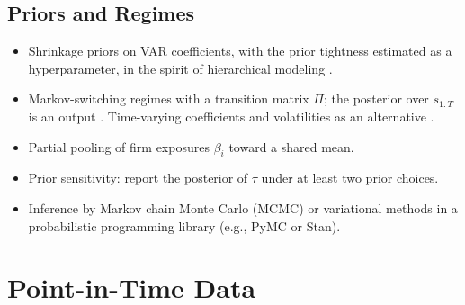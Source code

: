   \subsection{Priors and Regimes}\label{sec:priors_and_regimes}

  \begin{itemize}
  \tightlist
  \item
    Shrinkage priors on VAR coefficients, with the prior tightness
    estimated as a hyperparameter, in the spirit of hierarchical modeling
    \cite{doan1984forecasting,banbura2010large,giannone2015prior}.
  \item
    Markov-switching regimes with a transition matrix \(\Pi\); the
    posterior over \(s_{1:T}\) is an output
    \cite{hamilton1989new,sims2006were}. Time-varying coefficients and
    volatilities as an alternative \cite{primiceri2005time}.
  \item
    Partial pooling of firm exposures \(\beta_i\) toward a shared mean.
  \item
    Prior sensitivity: report the posterior of \(\tau\) under at least two
    prior choices.
  \item
    Inference by Markov chain Monte Carlo (MCMC) or variational methods in
    a probabilistic programming library (e.g., PyMC or Stan).
  \end{itemize}


  \section{Point-in-Time Data}\label{sec:point_in_time}

